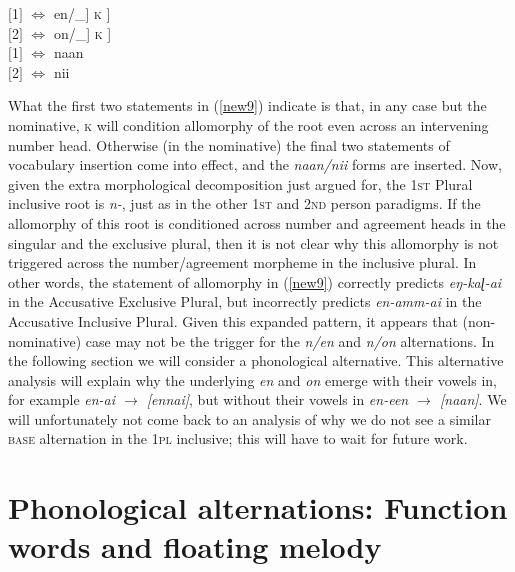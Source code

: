 \documentclass[output=paper]{langscibook}
\begin{document}
\begin{exe}
\ex \label{new9}
$[$1$]$ \hspace{6pt} $\Leftrightarrow$  \hspace{5pt}    en/\_] \textsc{k} ] \\
$[$2$]$ \hspace{5pt} $\Leftrightarrow$  \hspace{5pt}    on/\_] \textsc{k} ] \\
$[$1$]$ \hspace{6pt} $\Leftrightarrow$  \hspace{5pt}  naan\\
$[$2$]$ \hspace{5pt} $\Leftrightarrow$  \hspace{5pt}  nii
\end{exe}

What the first two statements in (\ref{new9}) indicate is that, in any case but the nominative, \textsc{k} will condition allomorphy of the root even across an intervening number head. Otherwise (in the nominative) the final two statements of vocabulary insertion come into effect, and the \textit{naan/nii} forms are inserted. Now, given the extra morphological decomposition just argued for, the 1\textsc{st} Plural inclusive root is\textit{ n-}, just as in the other 1\textsc{st} and 2\textsc{nd} person paradigms. If the allomorphy of this root is conditioned across number and agreement heads in the singular and the exclusive plural, then it is not clear why this allomorphy is not triggered across the number/agreement morpheme in the inclusive plural. In other words, the statement of allomorphy in (\ref{new9}) correctly predicts \textit{eŋ-kaɭ-ai} in the Accusative Exclusive Plural, but incorrectly predicts	 \textit{en-amm-ai} in the Accusative Inclusive Plural. Given this expanded pattern, it appears that (non-nominative) case may not be the trigger for the \textit{n/en} and \textit{n/on} alternations. In the following section we will consider a phonological alternative. This alternative analysis will explain why the underlying \textit{en} and \textit{on} emerge with their vowels in, for example \textit{en-ai $\rightarrow$ [ennai]}, but without their vowels in \textit{en-een $\rightarrow$ [naan]}. We will unfortunately not come back to an analysis of why we do not see a similar \textsc{base} alternation in the 1\textsc{pl} inclusive; this will have to wait for future work.

\section{Phonological alternations: Function words and floating melody}\label{sec:newell:3}
\end{document}
